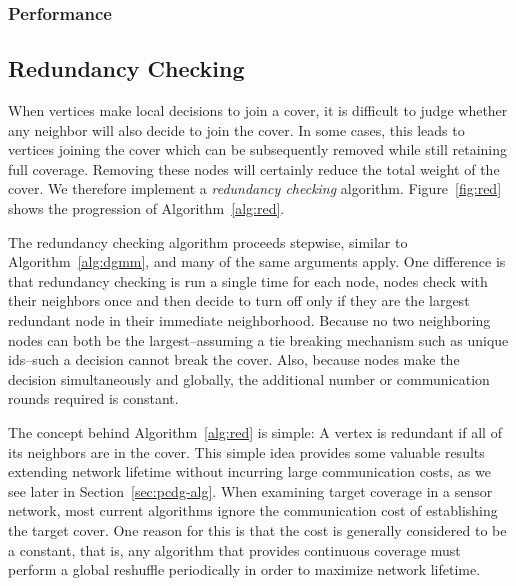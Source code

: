 

\subsubsection{Performance}




\subsection{Redundancy Checking}
\label{sec:redundant}
When vertices make local decisions to join a cover, it is difficult to judge whether any neighbor will also decide to join the cover. In some cases, this leads to vertices joining the cover which can be subsequently removed while still retaining full coverage. Removing these nodes will certainly reduce the total weight of the cover. We therefore implement a {\em redundancy checking} algorithm. Figure~\ref{fig:red} shows the progression of Algorithm~\ref{alg:red}.

 



The redundancy checking algorithm proceeds stepwise, similar to Algorithm~\ref{alg:dgmm}, and many of the same arguments apply. One difference is that redundancy checking is run a single time for each node, nodes check with their neighbors once and then decide to turn off only if they are the largest redundant node in their immediate neighborhood. Because no two neighboring nodes can both be the largest--assuming a tie breaking mechanism such as unique ids--such a decision cannot break the cover. Also, because nodes make the decision simultaneously and globally, the additional number or communication rounds required is constant.

The concept behind Algorithm~\ref{alg:red} is simple: A vertex is redundant if all of its neighbors are in the cover. This simple idea provides some valuable results extending network lifetime without incurring large communication costs, as we see later in Section~\ref{sec:pcdg-alg}. When examining target coverage in a sensor network, most current algorithms ignore the communication cost of establishing the target cover\cite{1514028}. One reason for this is that the cost is generally considered to be a constant, that is, any algorithm that provides continuous coverage must perform a global reshuffle periodically in order to maximize network lifetime. 

